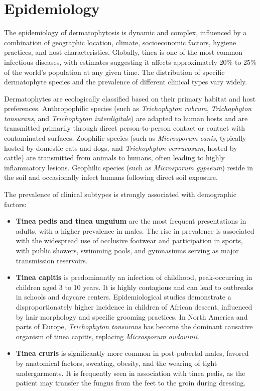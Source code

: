 \section*{Epidemiology}
The epidemiology of dermatophytosis is dynamic and complex, influenced by a combination of geographic location, climate, socioeconomic factors, hygiene practices, and host characteristics. Globally, tinea is one of the most common infectious diseases, with estimates suggesting it affects approximately 20\% to 25\% of the world's population at any given time. The distribution of specific dermatophyte species and the prevalence of different clinical types vary widely.

Dermatophytes are ecologically classified based on their primary habitat and host preferences. Anthropophilic species (such as \textit{Trichophyton rubrum}, \textit{Trichophyton tonsurans}, and \textit{Trichophyton interdigitale}) are adapted to human hosts and are transmitted primarily through direct person-to-person contact or contact with contaminated surfaces. Zoophilic species (such as \textit{Microsporum canis}, typically hosted by domestic cats and dogs, and \textit{Trichophyton verrucosum}, hosted by cattle) are transmitted from animals to humans, often leading to highly inflammatory lesions. Geophilic species (such as \textit{Microsporum gypseum}) reside in the soil and occasionally infect humans following direct soil exposure.

The prevalence of clinical subtypes is strongly associated with demographic factors:
\begin{itemize}
    \item \textbf{Tinea pedis and tinea unguium} are the most frequent presentations in adults, with a higher prevalence in males. The rise in prevalence is associated with the widespread use of occlusive footwear and participation in sports, with public showers, swimming pools, and gymnasiums serving as major transmission reservoirs.
    \item \textbf{Tinea capitis} is predominantly an infection of childhood, peak-occurring in children aged 3 to 10 years. It is highly contagious and can lead to outbreaks in schools and daycare centers. Epidemiological studies demonstrate a disproportionately higher incidence in children of African descent, influenced by hair morphology and specific grooming practices. In North America and parts of Europe, \textit{Trichophyton tonsurans} has become the dominant causative organism of tinea capitis, replacing \textit{Microsporum audouinii}.
    \item \textbf{Tinea cruris} is significantly more common in post-pubertal males, favored by anatomical factors, sweating, obesity, and the wearing of tight undergarments. It is frequently seen in association with tinea pedis, as the patient may transfer the fungus from the feet to the groin during dressing.
\end{itemize}

